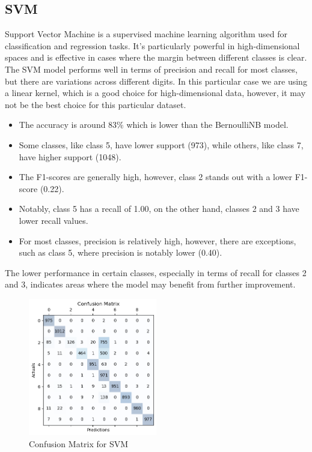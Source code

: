 \documentclass{article}
\begin{document}
\begin{titlepage}
  \section{SVM}
  Support Vector Machine is a supervised machine learning algorithm used for classification and regression tasks. It's particularly powerful in high-dimensional spaces and is effective in cases where the margin between different classes is clear.
  \newline
  \newline
  The SVM model performs well in terms of precision and recall for most classes, but there are variations across different digits.
  \newline
  In this particular case we are using a linear kernel, which is a good choice for high-dimensional data, however, it may not be the best choice for this particular dataset.

  \begin{itemize}
    \item The accuracy is around 83\% which is lower than the BernoulliNB model.
    \item Some classes, like class 5, have lower support (973), while others, like class 7, have higher support (1048).
    \item The F1-scores are generally high, however, class 2 stands out with a lower F1-score (0.22).
    \item Notably, class 5 has a recall of 1.00, on the other hand, classes 2 and 3 have lower recall values.
    \item For most classes, precision is relatively high, however, there are exceptions, such as class 5, where precision is notably lower (0.40).
  \end{itemize}

  The lower performance in certain classes, especially in terms of recall for classes 2 and 3, indicates areas where the model may benefit from further improvement.

  \begin{figure}[htbp]
    \centering
    \includegraphics[width=0.5\textwidth]{SVMCM.png}
    \caption{Confusion Matrix for SVM}
    \label{fig:sample2}
  \end{figure}


\end{titlepage}
\end{document}
